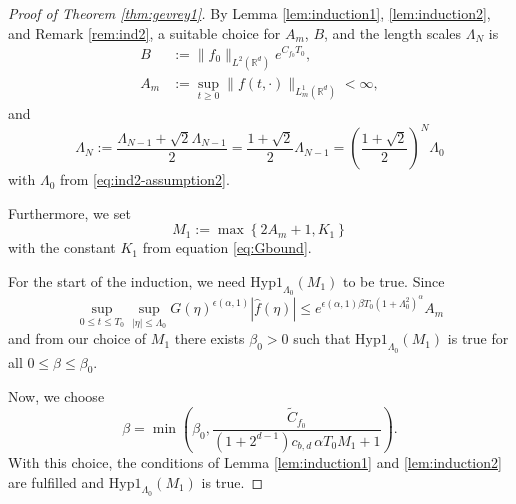 \documentclass[11pt,a4paper,reqno]{amsart}
\theoremstyle{plain}
\theoremstyle{definition}
\begin{document}
\begin{proof}[Proof of Theorem \ref{thm:gevrey1}]
	By Lemma \ref{lem:induction1}, \ref{lem:induction2}, and Remark \ref{rem:ind2}, a suitable choice for $A_m$, $B$, and the length scales $\Lambda_N$ is
 \begin{align*}
    B&:= \|f_0\|_{L^2({\mathbb{R}}^d)} e^{C_{f_0}T_0}, \\
    A_m&:= \sup_{t\geq 0} \|f(t, \cdot)\|_{L^1_m({\mathbb{R}}^d)} < \infty ,
   \end{align*}
   and
  \begin{equation*}
    \Lambda_N := \frac{\Lambda_{N-1}+\sqrt{2}\Lambda_{N-1}}{2} = \frac{1+\sqrt{2}}{2}\Lambda_{N-1} =
    \left( \frac{1+\sqrt{2}}{2} \right)^N \Lambda_0
  \end{equation*}
  with  $\Lambda_0$ from \eqref{eq:ind2-assumption2}.

  Furthermore, we set
  \begin{equation*}
    M_1:= \max \left\{ 2 A_m+1, K_1 \right\}
  \end{equation*}	
  with the constant $K_1$ from equation \eqref{eq:Gbound}.

 For the start of the induction, we need $\mathrm{Hyp1}_{\Lambda_0}(M_1)$ to be true.
 Since
 \begin{equation*}
 	\sup_{0\le t\le T_0} \sup_{|\eta|\le \Lambda_0} G(\eta)^{\epsilon(\alpha,1)} |\hat{f}(\eta)|
 	\le e^{\epsilon(\alpha,1) \beta T_0 (1+\Lambda_0^2)^{\alpha}} A_m
  \end{equation*}
  and from our choice of $M_1$ there exists $\beta_0 >0$ such that $\mathrm{Hyp1}_{\Lambda_0}(M_1)$ is true for all $0\le\beta\le \beta_0$.

  Now, we choose
  \begin{equation*}
  	\beta=\min \left( \beta_0, \frac{\tilde{C}_{f_0}}{(1+2^{d-1}) c_{b,d} \, \alpha T_0 M_1 +1} \right).
  \end{equation*}
  With this choice, the conditions of Lemma \ref{lem:induction1} and \ref{lem:induction2} are fulfilled and $\mathrm{Hyp1}_{\Lambda_0}(M_1)$ is true.


\end{proof}
\end{document}
